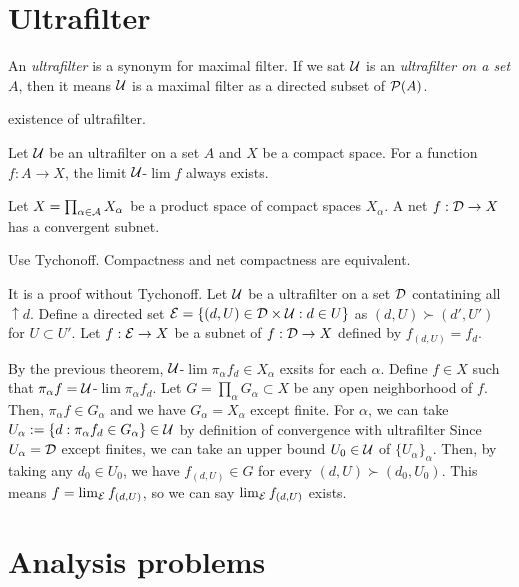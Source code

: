 \documentclass[11pt]{article}
\let\realsection\section
\renewcommand\section{\newpage\realsection}
\begin{document}
\section{Ultrafilter}
\begin{defn}
An \emph{ultrafilter} is a synonym for maximal filter.
If we sat $\mathcal{U}$ is an \emph{ultrafilter on a set} $A$, then it means $\mathcal{U}$ is a maximal filter as a directed subset of $\mathcal{P}(A)$.
\end{defn}
existence of ultrafilter.
\begin{thm}
Let $\mathcal{U}$ be an ultrafilter on a set $A$ and $X$ be a compact space.
For a function $f:A\to X$, the limit $\mathcal{U}$-$\lim f$ always exists.
\end{thm}

\begin{thm}
Let $X=\prod_{\alpha\in\mathcal{A}}X_\alpha$ be a product space of compact spaces $X_\alpha$.
A net $f:\cD\to X$ has a convergent subnet.
\end{thm}
\begin{pf}[1]
Use Tychonoff.
Compactness and net compactness are equivalent.
\end{pf}
\begin{pf}[2]
It is a proof without Tychonoff.
Let $\mathcal{U}$ be a ultrafilter on a set $\mathcal{D}$ contatining all $\uparrow d$.
Define a directed set $\mathcal{E}=\{(d,U)\in\mathcal{D}\times\mathcal{U}:d\in U\}$ as $(d,U)\succ(d',U')$ for $U\subset U'$.
Let $f:\cE\to X$ be a subnet of $f:\cD\to X$ defined by $f_{(d,U)}=f_d$.

By the previous theorem, $\mathcal{U}$-$\lim\pi_\alpha f_d\in X_\alpha$ exsits for each $\alpha$.
Define $f\in X$ such that $\pi_\alpha f=\mathcal{U}$-$\lim\pi_\alpha f_d$.
Let $G=\prod_\alpha G_\alpha\subset X$ be any open neighborhood of $f$.
Then, $\pi_\alpha f\in G_\alpha$ and we have $G_\alpha=X_\alpha$ except finite.
For $\alpha$, we can take $U_\alpha:=\{d:\pi_\alpha f_d\in G_\alpha\}\in\mathcal{U}$ by definition of convergence with ultrafilter
Since $U_\alpha=\mathcal{D}$ except finites, we can take an upper bound $U_0\in\mathcal{U}$ of $\{U_\alpha\}_\alpha$.
Then, by taking any $d_0\in U_0$, we have $f_{(d,U)}\in G$ for every $(d,U)\succ(d_0,U_0)$.
This means $f=\lim_{\mathcal{E}} f_{(d,U)}$, so we can say $\lim_{\mathcal{E}} f_{(d,U)}$ exists.
\end{pf}







\section{Analysis problems}
\end{document}
